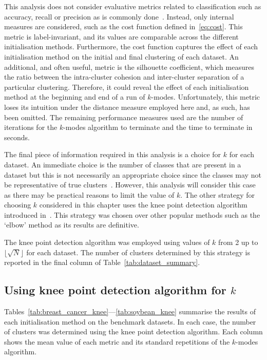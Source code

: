 This analysis does not consider evaluative metrics related to classification
such as accuracy, recall or precision as is commonly done~\cite{%
    Arthur2007,Cao2009,Cao2012,Huang1998,%
    Ng2007,Olaode2014,Schaeffer2007,Sharma2015%
}. Instead, only internal measures are considered, such as the cost function
defined in~\eqref{eq:cost}. This metric is label-invariant, and its values are
comparable across the different initialisation methods. Furthermore, the cost
function captures the effect of each initialisation method on the initial and
final clustering of each dataset. An additional, and often useful, metric is the
silhouette coefficient, which measures the ratio between the intra-cluster
cohesion and inter-cluster separation of a particular clustering. Therefore, it
could reveal the effect of each initialisation method at the beginning and end
of a run of \(k\)-modes.  Unfortunately, this metric loses its intuition under
the distance measure employed here and, as such, has been omitted. The remaining
performance measures used are the number of iterations for the \(k\)-modes
algorithm to terminate and the time to terminate in seconds.

The final piece of information required in this analysis is a choice for \(k\)
for each dataset. An immediate choice is the number of classes that are present
in a dataset but this is not necessarily an appropriate choice since the classes
may not be representative of true clusters~\cite{Memoli2011}. However, this
analysis will consider this case as there may be practical reasons to limit the
value of \(k\). The other strategy for choosing \(k\) considered in this chapter
uses the knee point detection algorithm introduced in~\cite{Satopaa2011}. This
strategy was chosen over other popular methods such as the `elbow' method as its
results are definitive.

The knee point detection algorithm was employed using values of \(k\) from 2 up
to \(\lfloor\sqrt N\rfloor\) for each dataset. The number of clusters determined
by this strategy is reported in the final column of
Table~\ref{tab:dataset_summary}.


\subsection{Using knee point detection algorithm for \(k\)}\label{subsec:knee}

Tables~\ref{tab:breast_cancer_knee}---\ref{tab:soybean_knee} summarise the
results of each initialisation method on the benchmark datasets. In each case,
the number of clusters was determined using the knee point detection algorithm.
Each column shows the mean value of each metric and its standard
repetitions of the \(k\)-modes algorithm.

